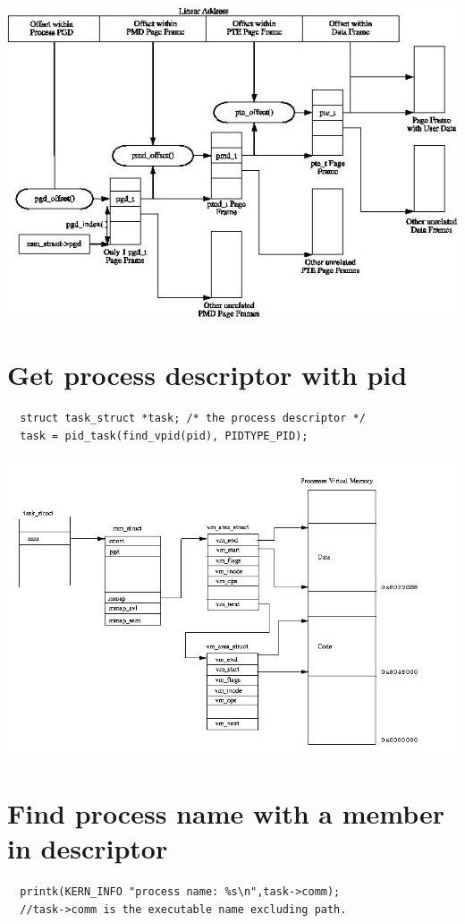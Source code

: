 	\includegraphics[scale=0.6]{pic/pg_layout.jpg}


  \section{Get process descriptor with pid}
  \begin{verbatim}
  struct task_struct *task; /* the process descriptor */
  task = pid_task(find_vpid(pid), PIDTYPE_PID);
  \end{verbatim}
  
  \includegraphics[scale=0.5]{pic/process-vm.jpg}
  
  \section{Find process name with a member in descriptor}
  \begin{verbatim}
  printk(KERN_INFO "process name: %s\n",task->comm);
  //task->comm is the executable name excluding path.
  \end{verbatim}